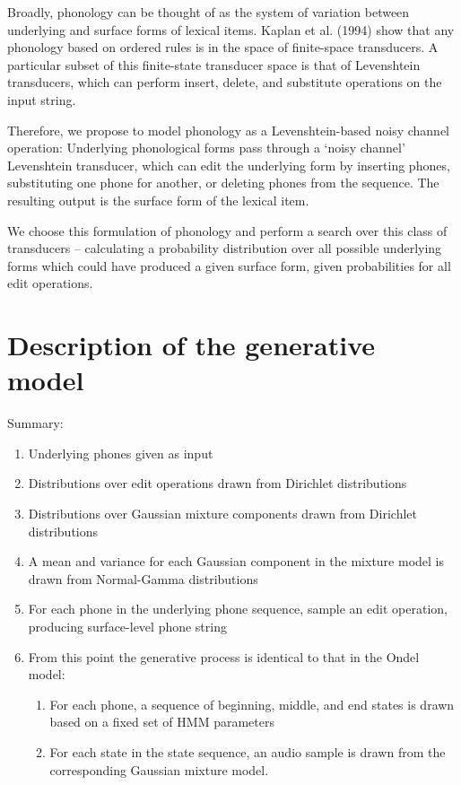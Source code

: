 \documentclass[11pt]{article}
\begin{document}
Broadly, phonology can be thought of as the system of variation between underlying and surface forms of lexical items. Kaplan et al. (1994) show that any phonology based on ordered rules is in the space of finite-space transducers. A particular subset of this finite-state transducer space is that of Levenshtein transducers, which can perform insert, delete, and substitute operations on the input string.

Therefore, we propose to model phonology as a Levenshtein-based noisy channel operation: Underlying phonological forms pass through a `noisy channel' Levenshtein transducer, which can edit the underlying form by inserting phones, substituting one phone for another, or deleting phones from the sequence. The resulting output is the surface form of the lexical item.

We choose this formulation of phonology and perform a search over this class of transducers -- calculating a probability distribution over all possible underlying forms which could have produced a given surface form, given probabilities for all edit operations.


\section{Description of the generative model}

Summary:
\begin{enumerate}
\item Underlying phones given as input
\item Distributions over edit operations drawn from Dirichlet distributions
\item Distributions over Gaussian mixture components drawn from Dirichlet distributions
\item A mean and variance for each Gaussian component in the mixture model is drawn from Normal-Gamma distributions
\item For each phone in the underlying phone sequence, sample an edit operation, producing surface-level phone string
\item From this point the generative process is identical to that in the Ondel model:
\begin{enumerate}
\item For each phone, a sequence of beginning, middle, and end states is drawn based on a fixed set of HMM parameters
\item For each state in the state sequence, an audio sample is drawn from the corresponding Gaussian mixture model. 
\end{enumerate}
\end{enumerate}
\end{document}
